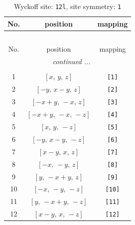 \documentclass[fleqn,8pt]{jsarticle}
\begin{document}
\begin{longtable}{ccc}
\caption{Wyckoff site: {\tt 12l}, site symmetry: {\tt 1}}
 \\
 \hline \hline
No. & position & mapping \\ \hline \endfirsthead

\multicolumn{2}{l}{\tablename\ \thetable{}} \\
 \hline \hline
No. & position & mapping \\ \hline \endhead

 \hline \hline
\multicolumn{2}{r}{\footnotesize\it continued ...} \\ \endfoot

 \hline \hline
\multicolumn{2}{r}{} \\ \endlastfoot

1 & $\left[ x,\, y,\, z \right]$ & {\tt [1]} \\ \hline
2 & $\left[ - y,\, x - y,\, z \right]$ & {\tt [2]} \\ \hline
3 & $\left[ - x + y,\, - x,\, z \right]$ & {\tt [3]} \\ \hline
4 & $\left[ - x + y,\, - x,\, - z \right]$ & {\tt [4]} \\ \hline
5 & $\left[ x,\, y,\, - z \right]$ & {\tt [5]} \\ \hline
6 & $\left[ - y,\, x - y,\, - z \right]$ & {\tt [6]} \\ \hline
7 & $\left[ x - y,\, x,\, z \right]$ & {\tt [7]} \\ \hline
8 & $\left[ - x,\, - y,\, z \right]$ & {\tt [8]} \\ \hline
9 & $\left[ y,\, - x + y,\, z \right]$ & {\tt [9]} \\ \hline
10 & $\left[ - x,\, - y,\, - z \right]$ & {\tt [10]} \\ \hline
11 & $\left[ y,\, - x + y,\, - z \right]$ & {\tt [11]} \\ \hline
12 & $\left[ x - y,\, x,\, - z \right]$ & {\tt [12]} \\
\end{longtable}
\end{document}
